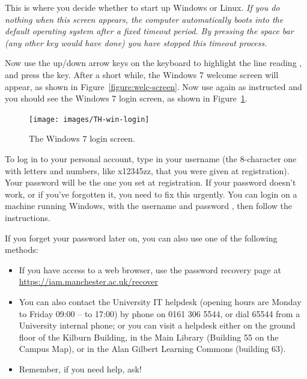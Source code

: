 This is where you decide whether to start up Windows or Linux. \emph{If you do nothing when this screen appears, the computer automatically boots into the default operating system after a fixed timeout period. By pressing the space bar (any other key would have done) you have stopped this timeout process. }

Now use the
up/down arrow keys on the keyboard to highlight the line
reading , and press the  key. After a short while, the Windows 7
welcome screen will appear, as shown in Figure~\ref{figure:welc-screen}. Now use   again as instructed and you should see the Windows 7 login screen, as shown in Figure~\ref{figure:login-screen}.

\begin{figure}
\centerline{\texttt{[image: images/TH-win-login]}}
\caption{The Windows 7 login screen.}
\label{figure:login-screen}
\end{figure}

\cbstart
To log in to your personal account, type in your username (the
8-character one with letters and numbers, like x12345zz, that you were
given at registration). 
\cbend
Your password will be the one you set at
registration. If your password doesn't work, or if you've forgotten
it, you need to fix this urgently. You can login on a machine running
Windows, with the username  and password
, then follow the instructions.

If you forget your password later on, you can also use one of the following methods:
\begin{itemize}
\item If you have access to a web browser, use the password recovery page at\\ \url{https://iam.manchester.ac.uk/recover}
\cbstart
\item You can also contact the University IT helpdesk (opening hours are Monday to Friday 09:00 -- to 17:00) by phone on 0161 306 5544, or dial 65544 from a University internal phone; or you can visit a helpdesk either on the ground floor of the Kilburn Building, in the Main Library (Building 55 on
the Campus Map), or in the Alan Gilbert Learning Commons (building 63).
\cbend
\item Remember, if you need help, ask!
\end{itemize}

